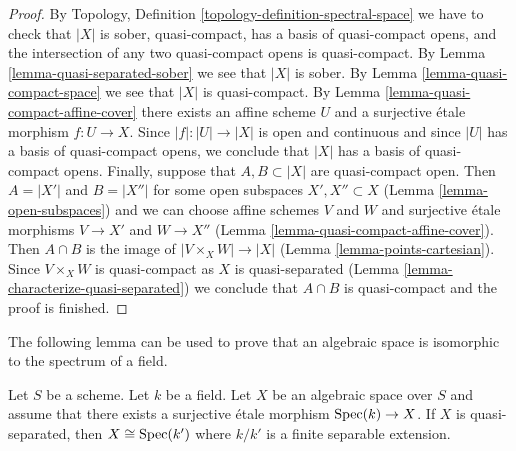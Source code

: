 \begin{proof}
By Topology, Definition \ref{topology-definition-spectral-space}
we have to check that $|X|$ is sober, quasi-compact, has a basis
of quasi-compact opens, and the intersection of any two
quasi-compact opens is quasi-compact. By
Lemma \ref{lemma-quasi-separated-sober} we see that $|X|$ is sober.
By Lemma \ref{lemma-quasi-compact-space} we see that $|X|$ is quasi-compact.
By Lemma \ref{lemma-quasi-compact-affine-cover} there exists an affine scheme
$U$ and a surjective \'etale morphism $f : U \to X$.
Since $|f| : |U| \to |X|$ is open and continuous and since $|U|$ has
a basis of quasi-compact opens, we conclude that $|X|$ has a basis
of quasi-compact opens. Finally, suppose that
$A, B \subset |X|$ are quasi-compact open. Then $A = |X'|$ and $B = |X''|$
for some open subspaces $X', X'' \subset X$ (Lemma \ref{lemma-open-subspaces})
and we can choose affine schemes $V$ and $W$ and surjective
\'etale morphisms $V \to X'$ and $W \to X''$
(Lemma \ref{lemma-quasi-compact-affine-cover}).
Then $A \cap B$ is the image of
$|V \times_X W| \to |X|$ (Lemma \ref{lemma-points-cartesian}).
Since $V \times_X W$ is quasi-compact as $X$ is quasi-separated
(Lemma \ref{lemma-characterize-quasi-separated})
we conclude that $A \cap B$ is quasi-compact and the proof is finished.
\end{proof}

\noindent
The following lemma can be used to prove that
an algebraic space is isomorphic to the spectrum of a field.

\begin{lemma}
\label{lemma-point-like-spaces}
Let $S$ be a scheme. Let $k$ be a field.
Let $X$ be an algebraic space over $S$ and assume that there exists
a surjective \'etale morphism $\mathop{\mathrm{Spec}}(k) \to X$.
If $X$ is quasi-separated, then $X \cong \mathop{\mathrm{Spec}}(k')$
where $k/k'$ is a finite separable extension.
\end{lemma}

